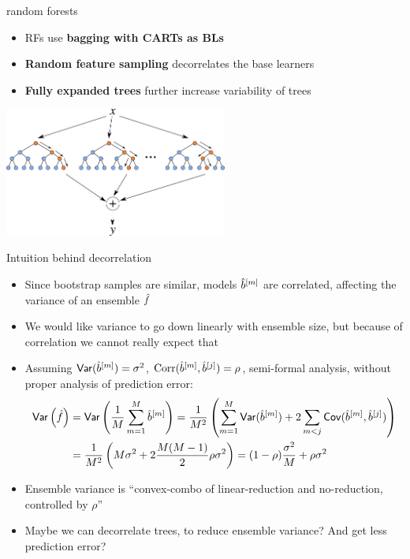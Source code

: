 \documentclass[11pt,compress,t,notes=noshow, xcolor=table]{beamer}
\begin{document}
\begin{vbframe}{random forests }


\begin{itemize}
\item RFs use \textbf{bagging with CARTs as BLs} %
\item \textbf{Random feature sampling} decorrelates the base learners
\item \textbf{Fully expanded trees} further increase variability of trees
\end{itemize}

\lz

\begin{center}
\includegraphics[width=0.55\textwidth]{figure_man/forest.png}
\end{center}

\end{vbframe}


\begin{vbframe}{Intuition behind decorrelation}
\begin{itemize}
  \item Since bootstrap samples are similar, models $\hat{b}^{[m]}$ are correlated, affecting the variance of an ensemble $\hat{f}$
  \item We would like variance to go down linearly with ensemble size, but because of correlation we cannot really expect that
  \item Assuming $\mathsf{Var}(\hat{b}^{[m]}) = \sigma^2$, $\text{Corr}(\hat{b}^{[m]}, \hat{b}^{[j]}) = \rho$, semi-formal analysis,
    without proper analysis of prediction error:
\begin{align*}
\mathsf{Var}\left(\hat{f}\right) &= \mathsf{Var}\left(\frac{1}{M} \sum_{m=1}^{M} \hat{b}^{[m]} \right) = \frac{1}{M^2} \left( \sum_{m=1}^{M} \mathsf{Var}(\hat{b}^{[m]}) + 2 \sum_{m < j} \mathsf{Cov}(\hat{b}^{[m]}, \hat{b}^{[j]}) \right) \\
&= \frac{1}{M^2} \left( M \sigma^2 + 2 \frac{M(M-1)}{2}\rho \sigma^2 \right) = (1-\rho)\frac{\sigma^2}{M} + \rho \sigma^2
\end{align*}

\item Ensemble variance is ``convex-combo of linear-reduction and no-reduction, controlled by $\rho$''
\item Maybe we can decorrelate trees, to reduce ensemble variance? And get less prediction error?
\end{itemize}
\end{vbframe}
\end{document}
